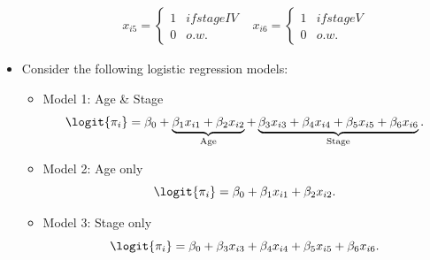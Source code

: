 \documentclass[oneside]{book}\usepackage[]{graphicx}\usepackage[svgnames]{xcolor}
\begin{document}
\begin{itemize}
\begin{itemize}
\[\begin{array}{ll}
                            x_{i5}  = \begin{cases*}
                                          1 & if stage IV \\
                                          0 & o.w.
                                      \end{cases*} &
                            x_{i6}  = \begin{cases*}
                                          1 & if stage V \\
                                          0 & o.w.
                                      \end{cases*}
                        \end{array} \]
          \end{itemize}
    \item Consider the following logistic regression models:
          \begin{itemize}
              \item Model 1: Age \& Stage
                    \[ \logit{\pi_i}=\beta_0+\underbrace{\beta_1x_{i1}+\beta_2x_{i2}}_{\text{Age}}+\underbrace{\beta_3x_{i3}+\beta_4x_{i4}+\beta_5x_{i5}+\beta_6x_{i6}}_{\text{Stage}}. \]
              \item Model 2: Age only
                    \[ \logit{\pi_i}=\beta_0+\beta_1x_{i1}+\beta_2x_{i2}. \]
              \item Model 3: Stage only
                    \[ \logit{\pi_i}=\beta_0+\beta_3x_{i3}+\beta_4x_{i4}+\beta_5x_{i5}+\beta_6x_{i6}. \]
          \end{itemize}
\end{itemize}
\end{document}

